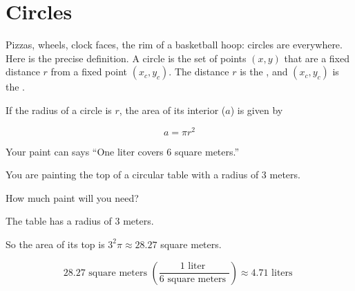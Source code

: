 \chapter{Circles}

Pizzas, wheels, clock faces, the rim of a basketball hoop: circles are
everywhere. Here is the precise definition. A circle is the set of points
$(x, y)$ that are a fixed distance $r$ from a fixed point $(x_c, y_c)$. The
distance $r$ is the , and $(x_c, y_c)$ is the
.

\begin{center}
\end{center}


\begin{mdframed}[style=important, frametitle={Area and Radius}]

  If the radius of a circle is $r$, the area of its interior ($a$) is given 
  by 

  $$a = \pi r^2$$

\end{mdframed}

\begin{Exercise}[title={Area of a Circle}, label=area_of_circle]

  Your paint can says ``One liter covers 6 square meters.''

  You are painting the top of a circular table with a radius of 3 meters.

  How much paint will you need?
  
\end{Exercise}
\begin{Answer}[ref=area_of_circle]

  The table has a radius of 3 meters.

  So the area of its top is $3^2 \pi \approx 28.27$ square meters.

  $$ 28.27 \text{ square meters }\left(\frac{1 \text{ liter }}{6 \text{ square 
  meters }} \right) \approx 4.71 \text{ liters }$$ 
  
\end{Answer}


